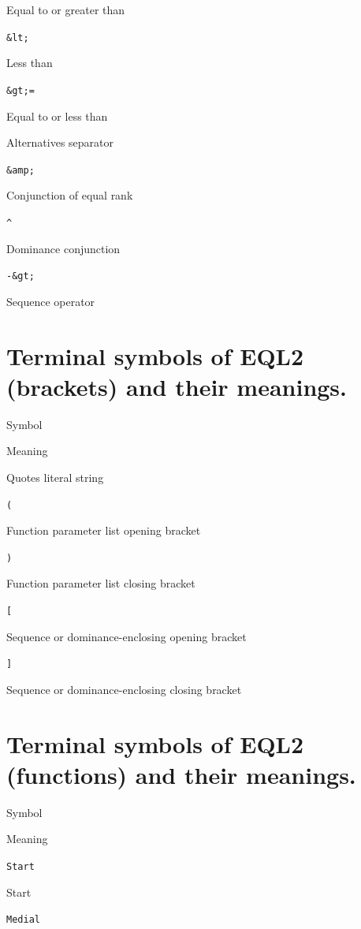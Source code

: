 \documentclass[]{book}
\theoremstyle{definition}
\theoremstyle{definition}
\theoremstyle{definition}
\theoremstyle{remark}
\begin{document}
Equal to or greater than

\texttt{\&lt;}

Less than

\texttt{\&gt;=}

Equal to or less than

\texttt{\textbar{}}

Alternatives separator

\texttt{\&amp;}

Conjunction of equal rank

\texttt{\^{}}

Dominance conjunction

\texttt{-\&gt;}

Sequence operator

\hypertarget{terminal-symbols-of-eql2-brackets-and-their-meanings.}{%
\section{Terminal symbols of EQL2 (brackets) and their
meanings.}\label{terminal-symbols-of-eql2-brackets-and-their-meanings.}}

Symbol

Meaning

\texttt{\textquotesingle{}}

Quotes literal string

\texttt{(}

Function parameter list opening bracket

\texttt{)}

Function parameter list closing bracket

\texttt{{[}}

Sequence or dominance-enclosing opening bracket

\texttt{{]}}

Sequence or dominance-enclosing closing bracket

\hypertarget{terminal-symbols-of-eql2-functions-and-their-meanings.}{%
\section{Terminal symbols of EQL2 (functions) and their
meanings.}\label{terminal-symbols-of-eql2-functions-and-their-meanings.}}

Symbol

Meaning

\texttt{Start}

Start

\texttt{Medial}
\end{document}

